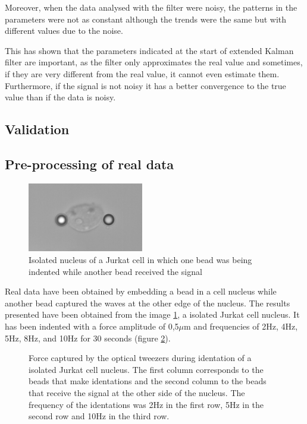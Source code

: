 \documentclass[12pt, a4paper]{article} %
\begin{document}
Moreover, when the data analysed with the filter were noisy, the patterns in the parameters were not as constant although the trends were the same but with different values due to the noise.

This has shown that the parameters indicated at the start of extended Kalman filter are important, as the filter only approximates the real value and sometimes, if they are very different from the real value, it cannot even estimate them. Furthermore, if the signal is not noisy it has a better convergence to the true value than if the data is noisy.

\setlength{\parskip}{0mm}

\subsection{Validation}

\subsection{Pre-processing of real data}

\begin{figure}
    \centering
    \includegraphics[width=0.45\textwidth]{figures/recorte_nucleo.png}
    \caption{Isolated nucleus of a Jurkat cell in which one bead was being indented while another bead received the signal}
    \label{fig:myfig3}
\end{figure}
Real data have been obtained by embedding a bead in a cell nucleus while another bead captured the waves at the other edge of the nucleus. The results presented have been obtained from the image \ref{fig:myfig3}, a isolated Jurkat cell nucleus. It has been indented with a force amplitude of 0,5$\mu$m and frequencies of 2Hz, 4Hz, 5Hz, 8Hz, and 10Hz for 30 seconds (figure \ref{fig:raw_data}).
\setlength{\parskip}{4mm}
\begin{figure}[htbp]
  \centering
  
  \caption{Force captured by the optical tweezers during identation of a isolated Jurkat cell nucleus. The first column corresponds to the beads that make identations and the second column to the beads that receive the signal at the other side of the nucleus. The frequency of the identations was 2Hz in the first row, 5Hz in the second row and 10Hz in the third row.}
  \label{fig:raw_data}
\end{figure}
\end{document}
